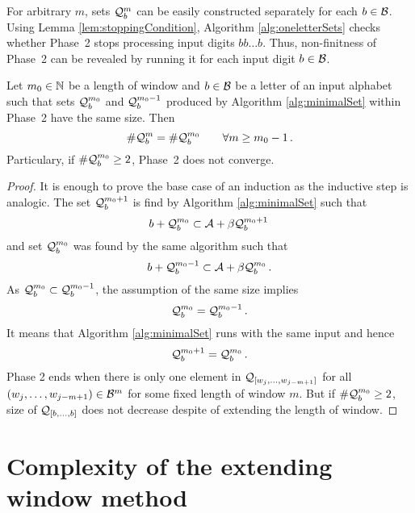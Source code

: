 For arbitrary $m$, sets $\mathcal{Q}^m_b$  can be easily constructed separately for each $b\in\mathcal{B}$. Using Lemma \ref{lem:stoppingCondition}, Algorithm \ref{alg:oneletterSets} checks whether Phase~2 stops processing input digits $bb\dots b$. Thus,  non-finitness of Phase~2 can be revealed by running it for each input digit $b\in\mathcal{B}$.
\begin{lem}
\label{lem:stoppingCondition}
Let $m_0 \in \mathbb{N}$ be a length of window and $b\in\mathcal{B}$ be a letter of an input alphabet such that sets $\mathcal{Q}^{m_0}_b$ and $\mathcal{Q}^{{m_0}-1}_b$ produced by Algorithm \ref{alg:minimalSet} within Phase~2 have the same size. Then
$$
    \#\mathcal{Q}^m_b = \#\mathcal{Q}^{m_0}_b \qquad \forall m\geq m_0-1\,.
$$ 
Particulary, if $\#\mathcal{Q}^{m_0}_b\geq 2$, Phase~2 does not converge.
\end{lem}
\begin{proof}
It is enough to prove the base case of an induction as the inductive step is analogic. The set $\mathcal{Q}^{m_0+1}_b$ is find by Algorithm \ref{alg:minimalSet} such that 
$$
b + \mathcal{Q}^{m_0}_b \subset \mathcal{A} + \beta \mathcal{Q}^{m_0+1}_b\,
$$
and set $\mathcal{Q}^{m_0}_b$ was found by the same algorithm such that
$$
b + \mathcal{Q}^{m_0-1}_b \subset \mathcal{A} + \beta \mathcal{Q}^{m_0}_b\,.
$$
As $\mathcal{Q}^{m_0}_b \subset \mathcal{Q}^{{m_0}-1}_b$, the assumption of the same size implies
$$
    \mathcal{Q}^{m_0}_b = \mathcal{Q}^{{m_0}-1}_b\,.
$$
It means that Algorithm \ref{alg:minimalSet} runs with the same input and hence
$$
\mathcal{Q}^{m_0+1}_b=\mathcal{Q}^{m_0}_b\,.
$$
Phase 2 ends when there is only one element in $\mathcal{Q}_{[w_j,\dots, w_{j-m+1}]}$ for all $(w_j,\dots, w_{j-m+1}) \in \mathcal{B}^m$ for some fixed length of window $m$. But if $\#\mathcal{Q}^{m_0}_b\geq 2$, size of $\mathcal{Q}_{[b,\dots,b]}$ does not decrease despite of extending the length of window.
\end{proof}



  
\section{Complexity of the extending window method}



















